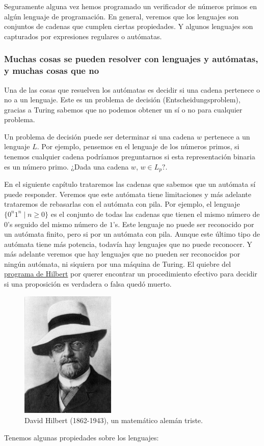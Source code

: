 \begin{enumerate}
    Seguramente alguna vez hemos programado un verificador de números primos en algún lenguaje de programación. En general, 
    veremos que los lenguajes son conjuntos de cadenas que cumplen ciertas propiedades. Y algunos lenguajes son capturados por expresiones regulares o autómatas.

    \subsubsection{Muchas cosas se pueden resolver con lenguajes y autómatas, y muchas cosas que no}

Una de las cosas que resuelven los autómatas es decidir si una cadena pertenece 
o no a un lenguaje. Este es un problema de decisión (Entscheidungsproblem), 
gracias a Turing sabemos que no podemos obtener un sí o no para cualquier problema. 

Un problema de decisión puede ser determinar si una cadena $w$ pertenece a un lenguaje $L$. 
Por ejemplo, pensemos en el lenguaje de los números primos, si tenemos cualquier cadena podríamos preguntarnos
si esta representación binaria es un número primo. ¿Dada una cadena $w$, $w \in L_p?$.  

En el siguiente capítulo trataremos las cadenas que sabemos que un autómata sí puede responder. 
Veremos que este autómata tiene limitaciones y más adelante trataremos de rebasarlas con el autómata con pila.
Por ejemplo, el lenguaje $\{0^n1^n \mid n \geq 0\}$ es el conjunto de todas las cadenas que tienen el mismo número de $0$'s seguido del mismo número de $1$'s.
Este lenguaje no puede ser reconocido por un autómata finito, pero si por un autómata con pila. Aunque este último tipo de autómata tiene más potencia, todavía hay lenguajes que no puede reconocer.
Y más adelante veremos que hay lenguajes que no pueden ser reconocidos por ningún autómata, ni siquiera por una máquina de Turing. El quiebre del \href{https://plato.stanford.edu/entries/hilbert-program/}{programa de Hilbert} por querer encontrar
un procedimiento efectivo para decidir si una proposición es verdadera o falsa quedó muerto. 

\begin{figure}
    \centering
    \includegraphics[width=0.4\textwidth]{images/Hilbert.jpg}
    \caption{David Hilbert (1862-1943), un matemático alemán triste.}
\end{figure}

\end{enumerate}
Tenemos algunas propiedades sobre los lenguajes: 

